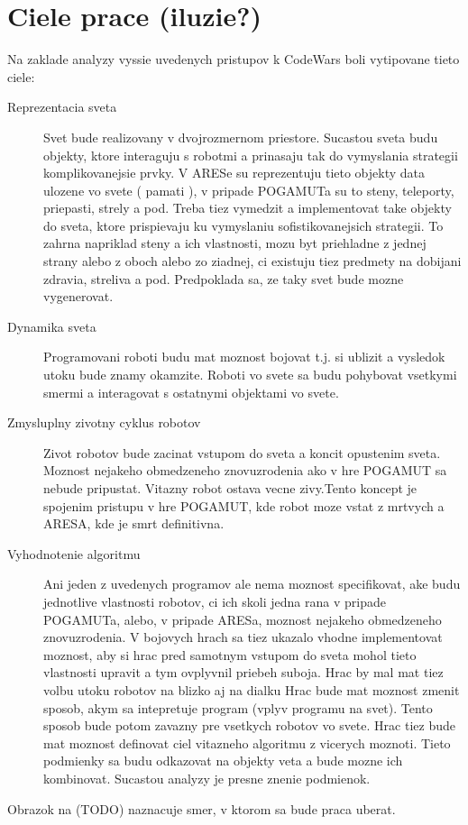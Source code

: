 \documentclass[a4paper,11pt,final]{report}
\begin{document}
\section{Ciele prace (iluzie?)}%
Na zaklade analyzy vyssie uvedenych pristupov k CodeWars boli vytipovane  tieto ciele:
\begin{description}
\item [Reprezentacia sveta]
Svet bude realizovany v dvojrozmernom priestore. Sucastou sveta budu objekty, ktore interaguju s robotmi a prinasaju tak do vymyslania strategii komplikovanejsie prvky. V ARESe su reprezentuju tieto objekty data ulozene vo svete ( pamati ), v pripade POGAMUTa su to steny, teleporty, priepasti, strely a pod. Treba tiez vymedzit a implementovat take objekty do sveta, ktore prispievaju ku vymyslaniu sofistikovanejsich strategii. To zahrna napriklad steny a ich vlastnosti, mozu byt priehladne z jednej strany alebo z oboch alebo zo ziadnej, ci existuju tiez predmety na dobijani zdravia, streliva a pod. Predpoklada sa, ze taky svet bude mozne vygenerovat.
\item [Dynamika sveta] 
Programovani roboti budu mat moznost bojovat t.j. si ublizit a vysledok utoku bude znamy okamzite. Roboti vo svete sa budu pohybovat vsetkymi smermi a interagovat s ostatnymi objektami vo svete.
\item [Zmysluplny zivotny cyklus robotov ] %
Zivot robotov bude zacinat vstupom do sveta a koncit opustenim sveta. Moznost  nejakeho obmedzeneho znovuzrodenia ako v hre POGAMUT sa nebude pripustat. Vitazny robot ostava vecne zivy.Tento koncept je spojenim pristupu v hre POGAMUT, kde robot moze vstat z mrtvych a ARESA, kde je smrt definitivna.
\item [Vyhodnotenie algoritmu] 
Ani jeden z uvedenych programov ale nema moznost specifikovat, ake budu  jednotlive  vlastnosti robotov, ci ich skoli jedna rana v pripade POGAMUTa,  alebo, v  pripade  ARESa, moznost nejakeho obmedzeneho znovuzrodenia. V  bojovych  hrach sa tiez ukazalo vhodne implementovat moznost, aby si hrac pred   samotnym vstupom do sveta mohol tieto  vlastnosti upravit a tym  ovplyvnil   priebeh suboja.
Hrac by mal  mat tiez volbu utoku robotov na blizko aj na dialku
Hrac bude mat moznost zmenit sposob, akym sa  intepretuje program (vplyv programu na svet). Tento sposob bude potom  zavazny pre vsetkych robotov vo svete. Hrac tiez bude mat moznost definovat ciel vitazneho algoritmu z vicerych moznoti. Tieto podmienky sa budu odkazovat na objekty veta a bude mozne ich kombinovat. Sucastou analyzy je presne znenie podmienok. %
\end{description}
Obrazok na (TODO) naznacuje smer, v ktorom sa bude praca  uberat. \\
\end{document}
